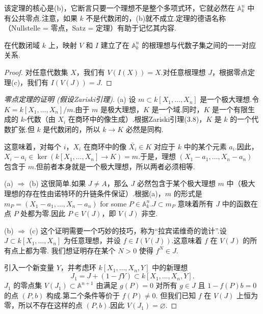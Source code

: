 该定理的核心是(b)，它断言只要一个理想不是整个多项式环，它就必然在 \({\mathbb{A}}_{k}^{n}\) 中有公共零点.注意，如果 \(k\) 不是代数闭的，(b)就不成立.定理的德语名称（Nullstelle = 零点，Satz = 定理）有助于记忆其内容.

\begin{corollary}
在代数闭域 \(k\) 上，映射 \(V\) 和 \(I\) 建立了在 \({\mathbb{A}}_{k}^{n}\) 的根理想与代数子集之间的一一对应关系.
\end{corollary}
\begin{proof}
对任意代数集 \(X\)，我们有 \(V\left( {I\left( X\right) }\right)  = X\).对任意根理想 \(J\)，根据零点定理(c)，我们有 \(I\left( {V\left( J\right) }\right)  = J\).
\end{proof}

\begin{proof}[零点定理的证明 (假设Zariski引理)]
(a) 设 \(m \subset  k\left\lbrack  {{X}_{1},\ldots ,{X}_{n}}\right\rbrack\) 是一个极大理想.令 \(K = k\left\lbrack  {{X}_{1},\ldots ,{X}_{n}}\right\rbrack  /m\).由于 \(m\) 是极大理想，\(K\) 是一个域.同时，\(K\) 是一个有限生成的 \(k\)-代数（由 \({X}_{i}\) 在商环中的像生成）.根据Zariski引理(3.8)，\(K\) 是 \(k\) 的一个代数扩张.但 \(k\) 是代数闭的，所以 \(k \to K\) 必然是同构.

这意味着，对每个 \(i\)，\({X}_{i}\) 在商环中的像 \(\bar{X_i} \in K\) 对应于 \(k\) 中的某个元素 \({a}_{i}\).因此，\({X}_{i} - {a}_{i} \in \ker(k[X_1,\dots,X_n] \to K) = m\).于是，理想 \(\left( {{X}_{1} - {a}_{1},\ldots ,{X}_{n} - {a}_{n}}\right)\) 包含于 \(m\).但前者本身就是一个极大理想，所以两者必须相等.

(a) \(\Rightarrow\) (b) 这很简单.如果 \(J \neq A\)，那么 \(J\) 必然包含于某个极大理想 \(m\) 中（极大理想的存在性由诺特环的升链条件保证）.根据(a)，\(m\) 的形式是 \({m}_{P} = \left( {{X}_{1} - {a}_{1},\ldots ,{X}_{n} - {a}_{n}}\right)\) for some \(P \in {\mathbb{A}}_{k}^{n}\).\(J \subset m_P\) 意味着所有 \(J\) 中的函数在点 \(P\) 处都为零.因此 \(P \in  V\left( J\right)\)，即 \(V(J)\) 非空.

(b) \(\Rightarrow\) (c) 这个证明需要一个巧妙的技巧，称为“拉宾诺维奇的诡计”.设 \(J \subset  k\left\lbrack  {{X}_{1},\ldots ,{X}_{n}}\right\rbrack\) 为任意理想，并设 \(f \in I(V(J))\).这意味着 \(f\) 在 \(V(J)\) 的所有点上都为零.
我们想证明存在某个 \(N>0\) 使得 \({f}^{N} \in  J\).

引入一个新变量 \(Y\)，并考虑环 \(k\left\lbrack  {{X}_{1},\ldots ,{X}_{n},Y}\right\rbrack\) 中的新理想
\[
{J}_{1} = J + \left( {1 - fY}\right)  \subset  k\left\lbrack  {{X}_{1},\ldots ,{X}_{n},Y}\right\rbrack.
\]
\(J_1\) 的零点集 \(V(J_1) \subset {\mathbb{A}}^{n+1}\) 由满足 \(g(P)=0\) 对所有 \(g \in J\) 且 \(1-f(P)b=0\) 的点 \((P,b)\) 构成.第二个条件等价于 \(f(P) \neq 0\).
但我们已知 \(f\) 在 \(V(J)\) 上恒为零，所以不存在这样的点 \((P,b)\).因此 \(V(J_1) = \varnothing\).


\end{proof}
